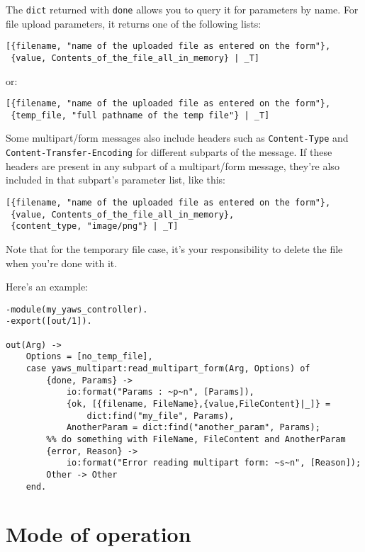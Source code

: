 \documentclass[11pt,oneside,english]{book}
\begin{document}
The \verb+dict+ returned with \verb+done+ allows you to query it for
parameters by name. For file upload parameters, it returns one of the
following lists:

\begin{verbatim}
[{filename, "name of the uploaded file as entered on the form"},
 {value, Contents_of_the_file_all_in_memory} | _T]
\end{verbatim}

or:

\begin{verbatim}
[{filename, "name of the uploaded file as entered on the form"},
 {temp_file, "full pathname of the temp file"} | _T]
\end{verbatim}

Some multipart/form messages also include headers such as
\verb+Content-Type+ and \verb+Content-Transfer-Encoding+ for different
subparts of the message. If these headers are present in any subpart
of a multipart/form message, they're also included in that subpart's
parameter list, like this:

\begin{verbatim}
[{filename, "name of the uploaded file as entered on the form"},
 {value, Contents_of_the_file_all_in_memory},
 {content_type, "image/png"} | _T]
\end{verbatim}

Note that for the temporary file case, it's your responsibility to
delete the file when you're done with it.

Here's an example:

\begin{verbatim}
-module(my_yaws_controller).
-export([out/1]).

out(Arg) ->
    Options = [no_temp_file],
    case yaws_multipart:read_multipart_form(Arg, Options) of
        {done, Params} ->
            io:format("Params : ~p~n", [Params]),
            {ok, [{filename, FileName},{value,FileContent}|_]} =
                dict:find("my_file", Params),
            AnotherParam = dict:find("another_param", Params);
        %% do something with FileName, FileContent and AnotherParam
        {error, Reason} ->
            io:format("Error reading multipart form: ~s~n", [Reason]);
        Other -> Other
    end.
\end{verbatim}


\chapter{Mode of operation}
\end{document}
